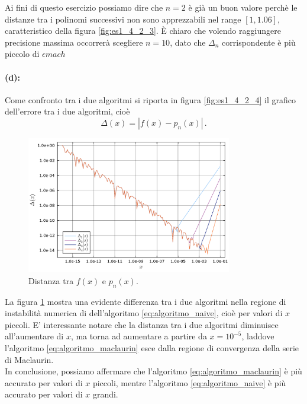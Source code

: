 \documentclass[letterpaper, 12pt]{article}
\begin{document}
Ai fini di questo esercizio possiamo dire che $n = 2$ è già un buon valore perchè le distanze tra i 
polinomi successivi non sono apprezzabili nel range $[1, 1.06]$, caratteristico della figura \ref{fig:es1_4_2_3}.
È chiaro che volendo raggiungere precisione massima occorrerà scegliere $n = 10$, dato che $\Delta_n$ 
corrispondente è più piccolo di $\epsilon{mach}$

\paragraph{(d): } Come confronto tra i due algoritmi si riporta in figura \ref{fig:es1_4_2_4} il grafico 
dell'errore tra i due algoritmi, cioè
\begin{equation}
    \Delta(x) = \left| f(x) - p_n(x) \right|\,.
\end{equation}

\begin{figure}[ht!]
    \centering
    \includegraphics[width=0.8\textwidth]{1425.pdf}
    \caption{Distanza tra $f(x)$ e $p_n(x)$.}
    \label{fig:es1_4_2_5}
\end{figure}

La figura \ref{fig:es1_4_2_5} mostra una evidente differenza tra i due algoritmi nella regione di instabilità
numerica di dell'algoritmo \ref{eq:algoritmo_naive}, cioè per valori di $x$ piccoli. E' interessante notare che 
la distanza tra i due algoritmi diminuisce all'aumentare di $x$, ma torna ad aumentare a partire da
$x = 10^{-5}$, laddove l'algoritmo \ref{eq:algoritmo_maclaurin} esce dalla regione di convergenza della 
serie di Maclaurin. \\
In conclusione, possiamo affermare che l'algoritmo \ref{eq:algoritmo_maclaurin} è più accurato
per valori di $x$ piccoli, mentre l'algoritmo \ref{eq:algoritmo_naive} è più accurato per valori di $x$
grandi.
\end{document}
